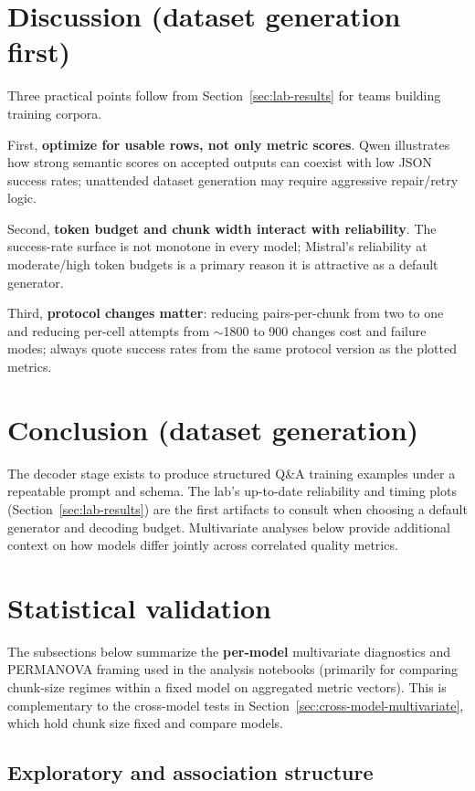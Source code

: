 \documentclass[11pt]{article}
\begin{document}
\section{Discussion (dataset generation first)}

Three practical points follow from Section~\ref{sec:lab-results} for teams building training corpora.

First, \textbf{optimize for usable rows, not only metric scores}. Qwen illustrates how strong semantic scores on accepted outputs can coexist with low JSON success rates; unattended dataset generation may require aggressive repair/retry logic.

Second, \textbf{token budget and chunk width interact with reliability}. The success-rate surface is not monotone in every model; Mistral's reliability at moderate/high token budgets is a primary reason it is attractive as a default generator.

Third, \textbf{protocol changes matter}: reducing pairs-per-chunk from two to one and reducing per-cell attempts from $\sim$1800 to 900 changes cost and failure modes; always quote success rates from the same protocol version as the plotted metrics.

\section{Conclusion (dataset generation)}

The decoder stage exists to produce structured Q\&A training examples under a repeatable prompt and schema. The lab's up-to-date reliability and timing plots (Section~\ref{sec:lab-results}) are the first artifacts to consult when choosing a default generator and decoding budget. Multivariate analyses below provide additional context on how models differ jointly across correlated quality metrics.

\section{Statistical validation}

\noindent The subsections below summarize the \textbf{per-model} multivariate diagnostics and PERMANOVA framing used in the analysis notebooks (primarily for comparing chunk-size regimes within a fixed model on aggregated metric vectors). This is complementary to the cross-model tests in Section~\ref{sec:cross-model-multivariate}, which hold chunk size fixed and compare models.

\subsection{Exploratory and association structure}
\end{document}
